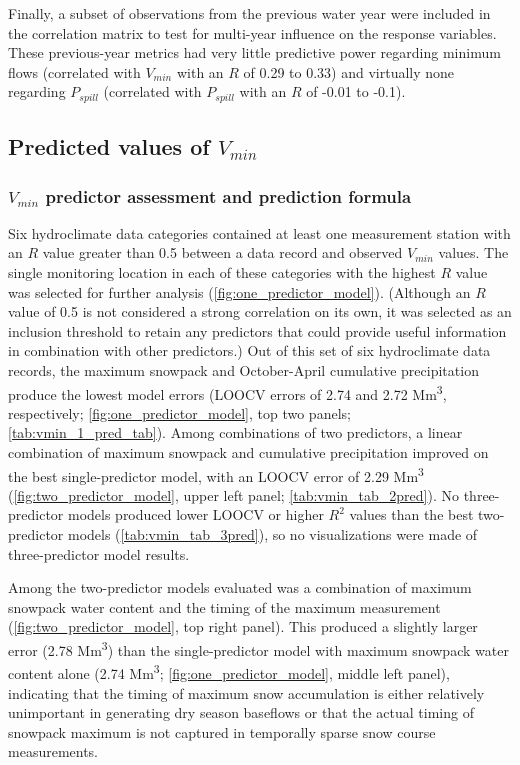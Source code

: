 \documentclass[hess, manuscript]{copernicus}
\begin{document}
Finally, a subset of observations from the previous water year were
included in the correlation matrix to test for multi-year influence on
the response variables. These previous-year metrics had very little
predictive power regarding minimum flows (correlated with \(V_{min}\)
with an \(R\) of 0.29 to 0.33) and virtually none regarding
\(P_{spill}\) (correlated with \(P_{spill}\) with an \(R\) of -0.01 to
-0.1).

\subsection{\texorpdfstring{Predicted values of
\(V_{min}\)}{Predicted values of V\_\{min\}}}

\subsubsection{\texorpdfstring{\(V_{min}\) predictor assessment and
prediction
formula}{V\_\{min\} predictor assessment and prediction formula}}

Six hydroclimate data categories contained at least one measurement
station with an \(R\) value greater than 0.5 between a data record and
observed \(V_{min}\) values. The single monitoring location in each of
these categories with the highest \(R\) value was selected for further
analysis (\autoref{fig:one_predictor_model}). (Although an \(R\) value
of 0.5 is not considered a strong correlation on its own, it was
selected as an inclusion threshold to retain any predictors that could
provide useful information in combination with other predictors.) Out of
this set of six hydroclimate data records, the maximum snowpack and
October-April cumulative precipitation produce the lowest model errors
(LOOCV errors of 2.74 and 2.72 Mm\textsuperscript{3}, respectively;
\autoref{fig:one_predictor_model}, top two panels;
\autoref{tab:vmin_1_pred_tab}). Among combinations of two predictors, a
linear combination of maximum snowpack and cumulative precipitation
improved on the best single-predictor model, with an LOOCV error of 2.29
Mm\textsuperscript{3} (\autoref{fig:two_predictor_model}, upper left
panel; \autoref{tab:vmin_tab_2pred}). No three-predictor models produced
lower LOOCV or higher \(R^2\) values than the best two-predictor models
(\autoref{tab:vmin_tab_3pred}), so no visualizations were made of
three-predictor model results.

Among the two-predictor models evaluated was a combination of maximum
snowpack water content and the timing of the maximum measurement
(\autoref{fig:two_predictor_model}, top right panel). This produced a
slightly larger error (2.78 Mm\textsuperscript{3}) than the
single-predictor model with maximum snowpack water content alone (2.74
Mm\textsuperscript{3}; \autoref{fig:one_predictor_model}, middle left
panel), indicating that the timing of maximum snow accumulation is
either relatively unimportant in generating dry season baseflows or that
the actual timing of snowpack maximum is not captured in temporally
sparse snow course measurements.
\end{document}
